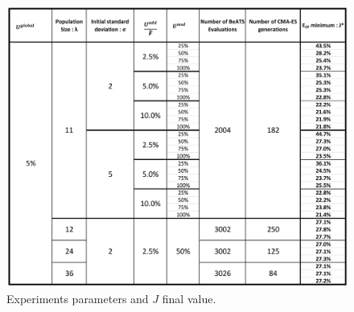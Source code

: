 \begin{figure}
\centering
	\caption{Experiments parameters and $J$ final value.}
	\label{fig:results_array}
	\includegraphics[width=7in]{figures/results_array.png}
\end{figure}
\newpage


